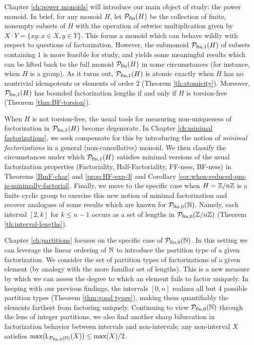 Chapter \ref{ch:power monoids} will introduce our main object of study: the power monoid.  
In brief, for any monoid $H$, let $\mathcal{P}_{\textrm{fin}}(H)$ be the collection of finite, nonempty subsets of $H$ with the operation of setwise multiplication given by $X\cdot Y = \{xy: x\in X, y\in Y\}$.  
This forms a monoid which can behave wildly with respect to questions of factorization.
However, the submonoid $\mathcal{P}_{\textrm{fin}, 1}(H)$ of subsets containing $1$ is more feasible for study, and yields some meaningful results which can be lifted back to the full monoid $\mathcal{P}_{\textrm{fin}}(H)$ in some circumstances (for instance, when $H$ is a group).
As it turns out, $\mathcal{P}_{\textrm{fin}, 1}(H)$ is atomic exactly when $H$ has no nontrivial idempotents or elements of order $2$ (Theorem \ref{th:atomicity}).
Moreover, $\mathcal{P}_{\textrm{fin}, 1}(H)$ has bounded factorization lengths if and only if $H$ is torsion-free (Theorem \ref{thm:BF-torsion}).

When $H$ is not torsion-free, the usual tools for measuring non-uniqueness of factorization in $\mathcal{P}_{\textrm{fin}, 1}(H)$ become degenerate.
In Chapter \ref{ch:minimal factorizations}, we seek compensate for this by introducing the notion of \textit{minimal factorizations} in a general (non-cancellative) monoid.
We then classify the circumstances under which $\mathcal{P}_{\textrm{fin}, 1}(H)$ satisfies minimal versions of the usual factorization properties (Factoriality, Half-Factoriality, FF-ness, BF-ness) in Theorems \ref{BmF-char} and \ref{prop:HF-exp-3} and Corollary \ref{cor:when-reduced-pm-is-minimally-factorial}.
Finally, we move to the specific case when $H = \mathbb{Z}/n\mathbb{Z}$ is a finite cyclic group to exercise this new notion of minimal factorization and recover analogues of some results which are known for ${\mathcal{P}_{\textrm{fin},0}(\mathbb{N})}$.
Namely, each interval $[ 2,k ]$ for $k\le n-1$ occurs as a set of lengths in $\mathcal{P}_{\textrm{fin}, 0}(\mathbb{Z}/n\mathbb{Z})$ (Theorem \ref{th:interval-lengths}).

Chapter \ref{ch:partitions} focuses on the specific case of ${\mathcal{P}_{\textrm{fin},0}(\mathbb{N})}$.
In this setting we can leverage the linear ordering of $\mathbb{N}$ to introduce the partition type of a given factorization.  
We consider the set of partition types of factorizations of a given element (by analogy with the more familiar set of lengths).
This is a new measure by which we can assess the degree to which an element fails to factor uniquely.  
In keeping with our previous findings, the intervals $[ 0,n ]$ realizes all but $4$ possible partition types (Theorem \ref{thm:good types}), making them quantifiably the elements farthest from factoring uniquely.
Continuing to view ${\mathcal{P}_{\textrm{fin},0}(\mathbb{N})}$ through the lens of integer partitions, we also find another sharp bifurcation in factorization behavior between intervals and non-intervals: any non-interval $X$ satisfies $\max(\mathsf{L}_{{\mathcal{P}_{\textrm{fin},0}(\mathbb{N})}}(X) )\le \max(X)/2$.

